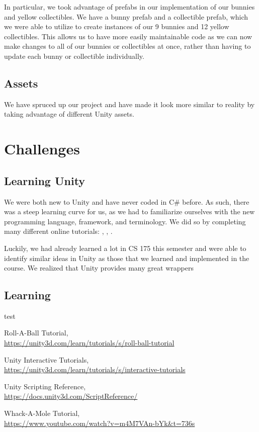 \documentclass[12pt]{article}
\begin{document}
  In particular, we took advantage of prefabs in our implementation of our bunnies and yellow collectibles. We have a bunny prefab and a collectible prefab, which we were able to utilize to create instances of our 9 bunnies and 12 yellow collectibles. This allows us to have more easily maintainable code as we can now make changes to all of our bunnies or collectibles at once, rather than having to update each bunny or collectible individually.


\subsection{Assets}
  We have spruced up our project and have made it look more similar to reality by taking advantage of different Unity assets.


\section{Challenges}
\subsection{Learning Unity}
We were both new to Unity and have never coded in C\# before. As such, there was a steep learning curve for us, as we had to familiarize ourselves with the new programming language, framework, and terminology. We did so by completing many different online tutorials: \cite{tutorial-rab}, \cite{tutorial1}, \cite{tutorial-wam}.

Luckily, we had already learned a lot in CS 175 this semester and were able to identify similar ideas in Unity as those that we learned and implemented in the course. We realized that Unity provides many great wrappers

\subsection{Learning } 
test

\begin{thebibliography}{999}

    Roll-A-Ball Tutorial, \\
    \url{https://unity3d.com/learn/tutorials/s/roll-ball-tutorial}

    Unity Interactive Tutorials, \\
    \url{https://unity3d.com/learn/tutorials/s/interactive-tutorials}

    Unity Scripting Reference, \\
    \url{https://docs.unity3d.com/ScriptReference/}

    Whack-A-Mole Tutorial, \\
    \url{https://www.youtube.com/watch?v=m4M7VAn-bYk&t=736s}

  \end{thebibliography}
\end{document}
